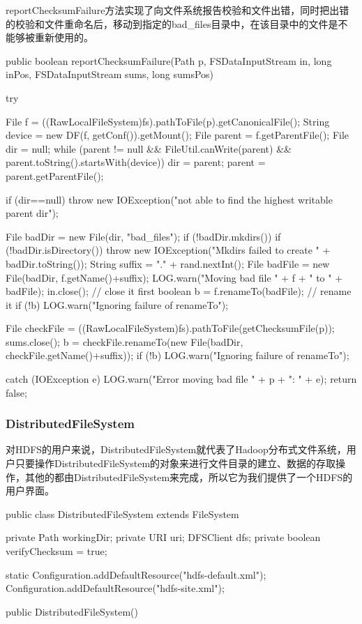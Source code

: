         reportChecksumFailure方法实现了向文件系统报告校验和文件出错，同时把出错的校验和文件重命名后，移动到指定的bad\_files目录中，在该目录中的文件是不能够被重新使用的。\\
        \begin{java}[caption=reportChecksumFailure]
public boolean reportChecksumFailure(Path p, FSDataInputStream in, long inPos, FSDataInputStream sums, long sumsPos) {
    try {
        File f = ((RawLocalFileSystem)fs).pathToFile(p).getCanonicalFile();
        String device = new DF(f, getConf()).getMount();
        File parent = f.getParentFile();
        File dir = null;
        while (parent != null && FileUtil.canWrite(parent) && parent.toString().startsWith(device)) {
            dir = parent;
            parent = parent.getParentFile();
        }

        if (dir==null) {
            throw new IOException("not able to find the highest writable parent dir");
        }
            
        File badDir = new File(dir, "bad_files");
        if (!badDir.mkdirs()) {
            if (!badDir.isDirectory()) {
            throw new IOException("Mkdirs failed to create " + badDir.toString());
            }
        }
        String suffix = "." + rand.nextInt();
        File badFile = new File(badDir, f.getName()+suffix);
        LOG.warn("Moving bad file " + f + " to " + badFile);
        in.close();                               // close it first
        boolean b = f.renameTo(badFile);                      // rename it
        if (!b) {
            LOG.warn("Ignoring failure of renameTo");
        }

        File checkFile = ((RawLocalFileSystem)fs).pathToFile(getChecksumFile(p));
        sums.close();
        b = checkFile.renameTo(new File(badDir, checkFile.getName()+suffix));
        if (!b) {
            LOG.warn("Ignoring failure of renameTo");
            }
    } catch (IOException e) {
        LOG.warn("Error moving bad file " + p + ": " + e);
    }
    return false;
}
        \end{java}

    \subsubsection{DistributedFileSystem}
        对HDFS的用户来说，DistributedFileSystem就代表了Hadoop分布式文件系统，用户只要操作DistributedFileSystem的对象来进行文件目录的建立、数据的存取操作，其他的都由DistributedFileSystem来完成，所以它为我们提供了一个HDFS的用户界面。
        \begin{java}[caption=DistributedFileSystem]
public class DistributedFileSystem extends FileSystem {  
    private Path workingDir;  
    private URI uri;  
    DFSClient dfs;  
    private boolean verifyChecksum = true;  
        
    static{  
        Configuration.addDefaultResource("hdfs-default.xml");  
        Configuration.addDefaultResource("hdfs-site.xml");  
    }  
    
    public DistributedFileSystem() {  
    }  
}  
        \end{java}

